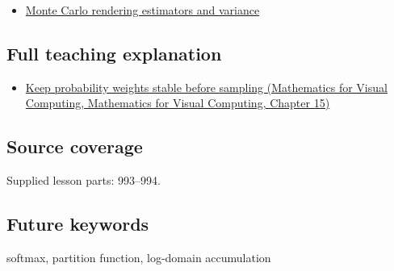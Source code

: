 \begin{itemize}
\tightlist
\item
  \hyperref[appendix-031e02bf28af]{Monte Carlo rendering estimators and variance}
\end{itemize}

\subsection{Full teaching explanation}\label{appendix-d580b422240f-full-teaching-explanation}

\begin{itemize}
\tightlist
\item
  \href{../02-Mathematics-for-Visual-Computing/main.pdf\#nameddest=02-foundations-ii-ch031-keep-probability-weights-stable-before-sampling}{Keep probability weights stable before sampling (Mathematics for Visual Computing, Mathematics for Visual Computing, Chapter 15)}
\end{itemize}

\subsection{Source coverage}\label{appendix-d580b422240f-source-coverage}

Supplied lesson parts: 993--994.

\subsection{Future keywords}\label{appendix-d580b422240f-future-keywords}

softmax, partition function, log-domain accumulation
